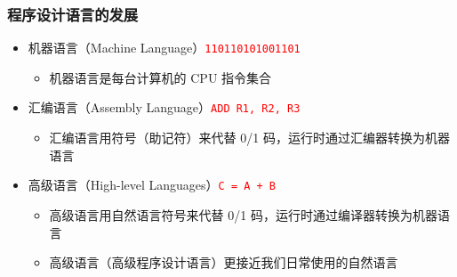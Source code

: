 \begin{frame}[fragile]
    \frametitle{程序设计语言的发展}

    \begin{itemize}
        \item<1-> 机器语言（Machine Language）\hfill \textcolor{red}{\lstinline|110110101001101|}

            \begin{itemize}
                \item 机器语言是每台计算机的 CPU 指令集合
            \end{itemize}

        \item<2-> 汇编语言（Assembly Language）\hfill \textcolor{red}{\lstinline|ADD R1, R2, R3|}

            \begin{itemize}
                \item 汇编语言用符号（助记符）来代替 0/1 码，运行时通过汇编器转换为机器语言
            \end{itemize}

        \item<3-> 高级语言（High-level Languages）\hfill \textcolor{red}{\lstinline|C = A + B|}

            \begin{itemize}
                \item 高级语言用自然语言符号来代替 0/1 码，运行时通过编译器转换为机器语言
                \item 高级语言（高级程序设计语言）更接近我们日常使用的自然语言
            \end{itemize}

    \end{itemize}
\end{frame}

